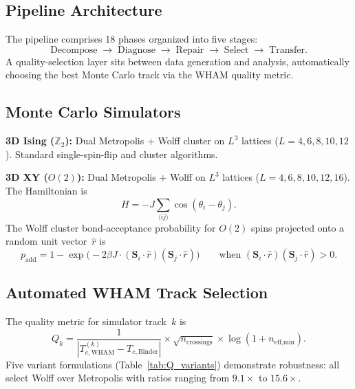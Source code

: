 \documentclass[11pt,a4paper]{article}
\begin{document}
\subsection{Pipeline Architecture}\label{sec:architecture}

The pipeline comprises 18 phases organized into five stages:
\[
  \text{Decompose} \;\to\; \text{Diagnose} \;\to\; \text{Repair} \;\to\; \text{Select} \;\to\; \text{Transfer}.
\]
A quality-selection layer sits between data generation and analysis, automatically choosing the best Monte Carlo track via the WHAM quality metric.

\subsection{Monte Carlo Simulators}\label{sec:simulators}

\textbf{3D Ising ($\mathbb{Z}_2$):} Dual Metropolis + Wolff cluster on $L^3$ lattices ($L = 4, 6, 8, 10, 12$). Standard single-spin-flip and cluster algorithms.

\textbf{3D XY ($O(2)$):} Dual Metropolis + Wolff on $L^3$ lattices ($L = 4, 6, 8, 10, 12, 16$). The Hamiltonian is
\begin{equation}\label{eq:hamiltonian}
  H = -J\sum_{\langle ij\rangle} \cos(\theta_i - \theta_j).
\end{equation}
The Wolff cluster bond-acceptance probability for $O(2)$ spins projected onto a random unit vector~$\hat{r}$ is
\begin{equation}\label{eq:wolff_bond}
  p_{\text{add}} = 1 - \exp\!\bigl(-2\beta J \cdot (\mathbf{S}_i \cdot \hat{r})(\mathbf{S}_j \cdot \hat{r})\bigr)
  \qquad\text{when } (\mathbf{S}_i \cdot \hat{r})(\mathbf{S}_j \cdot \hat{r}) > 0.
\end{equation}

\subsection{Automated WHAM Track Selection}\label{sec:wham_selection}

The quality metric for simulator track~$k$ is
\begin{equation}\label{eq:Q_k}
  Q_k = \frac{1}{|T_{c,\text{WHAM}}^{(k)} - T_{c,\text{Binder}}|} \times \sqrt{n_{\text{crossings}}} \times \log(1 + n_{\text{eff,min}}).
\end{equation}
Five variant formulations (Table~\ref{tab:Q_variants}) demonstrate robustness: all select Wolff over Metropolis with ratios ranging from $9.1\times$ to $15.6\times$.
\end{document}
